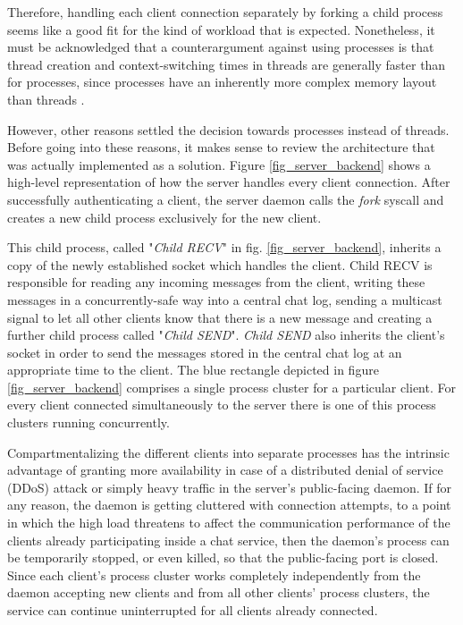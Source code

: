 Therefore, handling each client connection separately by forking a child process seems like a good fit for the kind of workload that is expected. Nonetheless, it must be acknowledged that a counterargument against using processes is that thread creation and context-switching times in threads are generally faster than for processes, since processes have an inherently more complex memory layout than threads \cite{Kerrisk2010}.

However, other reasons settled the decision towards processes instead of threads. Before going into these reasons, it makes sense to review the architecture that was actually implemented as a solution. Figure \ref{fig_server_backend} shows a high-level representation of how the server handles every client connection. After successfully authenticating a client, the server daemon calls the \textit{fork} syscall and creates a new child process exclusively for the new client.
 
This child process, called "\textit{Child RECV}" in fig. \ref{fig_server_backend}, inherits a copy of the newly established socket which handles the client. Child RECV is responsible for reading any incoming messages from the client, writing these messages in a concurrently-safe way into a central chat log, sending a multicast signal to let all other clients know that there is a new message and creating a further child process called "\textit{Child SEND}". \textit{Child SEND} also inherits the client's socket in order to send the messages stored in the central chat log at an appropriate time to the client. The blue rectangle depicted in figure \ref{fig_server_backend} comprises a single process cluster for a particular client. For every client connected simultaneously to the server there is one of this process clusters running concurrently.

 Compartmentalizing the different clients into separate processes has the intrinsic advantage of granting more availability in case of a distributed denial of service (DDoS) attack or simply heavy traffic in the server's public-facing daemon. If for any reason, the daemon is getting cluttered with connection attempts, to a point in which the high load threatens to affect the communication performance of the clients already participating inside a chat service, then the daemon's process can be temporarily stopped, or even killed, so that the public-facing port is closed. Since each client's process cluster works completely independently from the daemon accepting new clients and from all other clients' process clusters, the service can continue uninterrupted for all clients already connected. 
 
